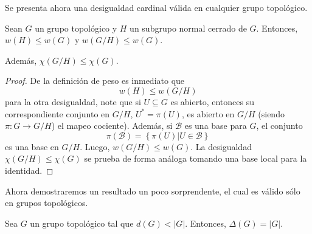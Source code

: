 \documentclass[12pt]{report}
\theoremstyle{largebreak}
\newcommand\abs[1]{\ensuremath{\lvert#1\rvert}}
\newcommand{\cf}[3]{\ensuremath{#1:#2\rightarrow#3}}
\begin{document}
    Se presenta ahora una desigualdad cardinal válida en cualquier grupo topológico.
    
    \begin{propo}
        Sean $G$ un grupo topológico y $H$ un subgrupo normal cerrado de $G$. Entonces, $w(H)\leq w(G)$ y $w(G/H)\leq w(G)$.

        Además, $\chi(G/H)\leq\chi(G)$.
    \end{propo}

    \begin{proof}
        De la definición de peso es inmediato que
        \begin{equation*}
            w(H)\leq w(G/H)
        \end{equation*}
        para la otra desigualdad, note que si $U\subseteq G$ es abierto, entonces su correspondiente conjunto en $G/H$, $U^*=\pi(U)$, es abierto en $G/H$ (siendo $\cf{\pi}{G}{G/H}$) el mapeo cociente). Además, si $\mathcal{B}$ es una base para $G$, el conjunto
        \begin{equation*}
            \pi(\mathcal{B})=\left\{\pi(U)\Big|U\in\mathcal{B} \right\}
        \end{equation*}
        es una base en $G/H$. Luego, $w(G/H)\leq w(G)$. La desigualdad $\chi(G/H)\leq\chi(G)$ se prueba de forma análoga tomando una base local para la identidad.
    \end{proof}

    Ahora demostraremos un resultado un poco sorprendente, el cual es válido sólo en grupos topológicos.

    \begin{theor}
        Sea $G$ un grupo topológico tal que $d(G)<\abs{G}$. Entonces, $\Delta(G)=\abs{G}$.
    \end{theor}
\end{document}

